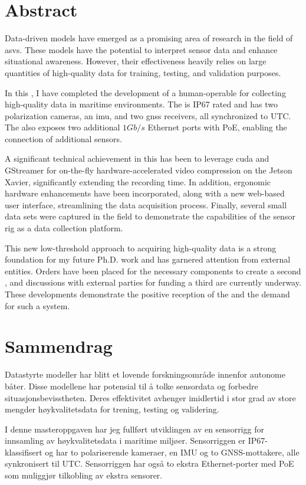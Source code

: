 \chapter*{Abstract}

Data-driven models have emerged as a promising area of research in the field of \glspl{asv}.
These models have the potential to interpret sensor data and enhance situational awareness.
However, their effectiveness heavily relies on large quantities of high-quality data for training, testing, and validation purposes.

In this \master, I have completed the development of a human-operable \sr for collecting high-quality data in maritime environments.
The \sr is IP67 rated and has two polarization cameras, an \gls{imu}, and two \gls{gnss} receivers, all synchronized to UTC.
The \sr also exposes two additional $1Gb/s$ Ethernet ports with PoE, enabling the connection of additional sensors.

A significant technical achievement in this \master has been to leverage \gls{cuda} and GStreamer for on-the-fly hardware-accelerated video compression on the Jetson Xavier, significantly extending the recording time.
In addition, ergonomic hardware enhancements have been incorporated, along with a new web-based user interface, streamlining the data acquisition process.
Finally, several small data sets were captured in the field to demonstrate the capabilities of the sensor rig as a data collection platform.

This new low-threshold approach to acquiring high-quality data is a strong foundation for my future Ph.D. work and has garnered attention from external entities.
Orders have been placed for the necessary components to create a second \sr, and discussions with external parties for funding a third \sr are currently underway.
These developments demonstrate the positive reception of the \sr and the demand for such a system.

\chapter*{Sammendrag}
Datastyrte modeller har blitt et lovende forskningsområde innenfor autonome båter. Disse modellene har potensial til å tolke sensordata og forbedre situasjonsbevisstheten. Deres effektivitet avhenger imidlertid i stor grad av store mengder høykvalitetsdata for trening, testing og validering.

I denne masteroppgaven har jeg fullført utviklingen av en sensorrigg for innsamling av høykvalitetsdata i maritime miljøer. Sensorriggen er IP67-klassifisert og har to polariserende kameraer, en IMU og to GNSS-mottakere, alle synkronisert til UTC. Sensorriggen har også to ekstra Ethernet-porter med PoE som muliggjør tilkobling av ekstra sensorer.

